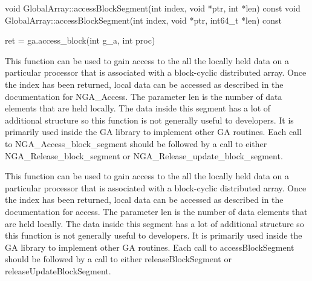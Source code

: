 \documentclass[12pt]{article}
\begin{document}
\begin{cxxapi}
\begin{cxxcode}
void GlobalArray::accessBlockSegment(int index, void *ptr,
                                     int *len) const
void GlobalArray::accessBlockSegment(int index, void *ptr,
                                     int64_t *len) const
\end{cxxcode}
\begin{funcargs}
\end{funcargs}
\end{cxxapi}

\begin{pyapi}
\begin{pycode}
ret = ga.access_block(int g_a, int proc)
\end{pycode}
\begin{funcargs}
\end{funcargs}
\end{pyapi}

\local

\begin{cdesc}
This function can be used to gain access to the all the locally held data on a
particular processor that is associated with a block-cyclic distributed array.
Once the index has been returned, local data can be accessed as described in
the documentation for NGA_Access. The parameter len is the number of data
elements that are held locally. The data inside this segment has a lot of
additional structure so this function is not generally useful to developers. It
is primarily used inside the GA library to implement other GA routines. Each
call to NGA_Access_block_segment should be followed by a call to either
NGA_Release_block_segment or NGA_Release_update_block_segment.
\end{cdesc}

\begin{cxxdesc}
This function can be used to gain access to the all the locally held data on a
particular processor that is associated with a block-cyclic distributed array.
Once the index has been returned, local data can be accessed as described in
the documentation for access. The parameter len is the number of data
elements that are held locally. The data inside this segment has a lot of
additional structure so this function is not generally useful to developers. It
is primarily used inside the GA library to implement other GA routines. Each
call to accessBlockSegment should be followed by a call to either
releaseBlockSegment or releaseUpdateBlockSegment.
\end{cxxdesc}
\end{document}
